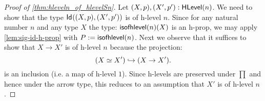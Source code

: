\begin{proof}[Proof of \autoref{thm:hleveln_of_hlevelSn}]
 Let $(X, p), (X', p') : \mathsf{HLevel}(n)$. We need to show that the type $\mathsf{Id}_{}((X, p),(X', p'))$ is of h-level $n$. Since for any natural number $n$ and any type $X$ the type: $\mathsf{isofhlevel}(n)(X)$ is an h-prop, we may apply \autoref{lem:sig-id-h-prop} with $P := \mathsf{isofhlevel}(n)$. Next we observe that it suffices to show that $X \rightarrow X'$ is of h-level $n$ because the projection:
 \[(X \simeq X') \hookrightarrow (X \rightarrow X').\]
 is an inclusion (i.e. a map of h-level $1$). Since h-levels are preserved under $\prod$ and hence under the arrow type, this reduces to an assumption that $X'$ is of h-level $n$.
\end{proof}